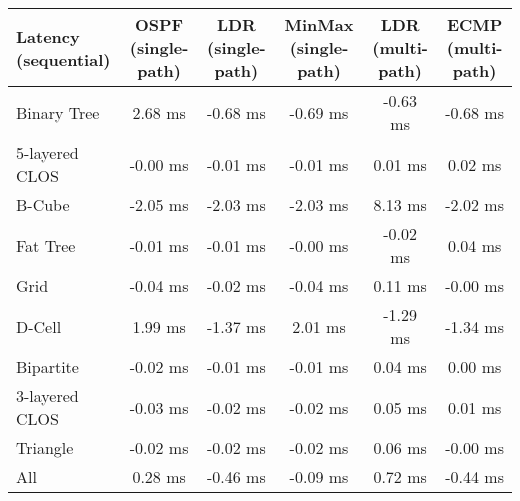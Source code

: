 \begin{tabular}{l|ccccc}
Latency (sequential) & OSPF (single-path) & LDR (single-path) & MinMax (single-path) & LDR (multi-path) & ECMP (multi-path) \\
\hline
Binary Tree          & 2.68 ms            & -0.68 ms          & -0.69 ms             & -0.63 ms         & -0.68 ms          \\
5-layered CLOS       & -0.00 ms           & -0.01 ms          & -0.01 ms             & 0.01 ms          & 0.02 ms           \\
B-Cube               & -2.05 ms           & -2.03 ms          & -2.03 ms             & 8.13 ms          & -2.02 ms          \\
Fat Tree             & -0.01 ms           & -0.01 ms          & -0.00 ms             & -0.02 ms         & 0.04 ms           \\
Grid                 & -0.04 ms           & -0.02 ms          & -0.04 ms             & 0.11 ms          & -0.00 ms          \\
D-Cell               & 1.99 ms            & -1.37 ms          & 2.01 ms              & -1.29 ms         & -1.34 ms          \\
Bipartite            & -0.02 ms           & -0.01 ms          & -0.01 ms             & 0.04 ms          & 0.00 ms           \\
3-layered CLOS       & -0.03 ms           & -0.02 ms          & -0.02 ms             & 0.05 ms          & 0.01 ms           \\
Triangle             & -0.02 ms           & -0.02 ms          & -0.02 ms             & 0.06 ms          & -0.00 ms          \\
All                  & 0.28 ms            & -0.46 ms          & -0.09 ms             & 0.72 ms          & -0.44 ms          \\
\end{tabular}